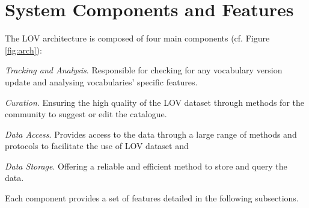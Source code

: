 \documentclass{iosart2c}
\begin{document}
\section{System Components and Features}\label{sec:arch}
	 The LOV architecture is composed of four main components (cf. Figure \ref{fig:arch}): 
\begin{inparaenum}[1)] 
	\item \emph{Tracking and Analysis}. Responsible for checking for any vocabulary version update and analysing vocabularies' specific features.
	\item \emph{Curation}. Ensuring the high quality of the LOV dataset through methods for the community to suggest or edit the catalogue.
	\item \emph{Data Access}. Provides access to the data through a large range of methods and protocols to facilitate the use of LOV dataset and
	\item \emph{Data Storage}. Offering a reliable and efficient method to store and query the data.
\end{inparaenum} 
Each component provides a set of features detailed in the following subsections.

\end{document}
